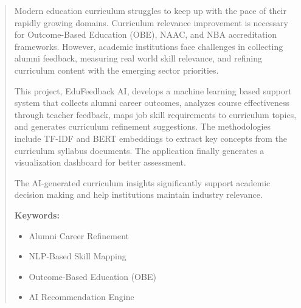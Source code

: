 \documentclass[oneside]{ecsproject}     %
\begin{document}

\begin{abstract}
Modern education curriculum struggles to keep up with the pace of their rapidly growing domains. Curriculum relevance improvement is necessary for Outcome-Based Education (OBE), NAAC, and NBA accreditation frameworks. However, academic institutions face challenges in collecting alumni feedback, measuring real world skill relevance, and refining curriculum content with the emerging sector priorities.

This project, EduFeedback AI, develops a machine learning based support system that collects alumni career outcomes, analyzes course effectiveness through teacher feedback, maps job skill requirements to curriculum topics, and generates curriculum refinement suggestions. The methodologies include TF-IDF and BERT embeddings to extract key concepts from the curriculum syllabus documents. The application finally generates a visualization dashboard for better assessment.

The AI-generated curriculum insights significantly support academic decision making and help institutions maintain industry relevance.

\textbf{Keywords:}
\begin{itemize}
    \item Alumni Career Refinement
    \item NLP-Based Skill Mapping
    \item Outcome-Based Education (OBE)
    \item AI Recommendation Engine
\end{itemize}
\end{abstract}

\cleardoublepage
\tableofcontents

\cleardoublepage
\listoffigures

\cleardoublepage
\listoftables

\mainmatter








\backmatter


\nocite{*}


\appendix
\end{document}
